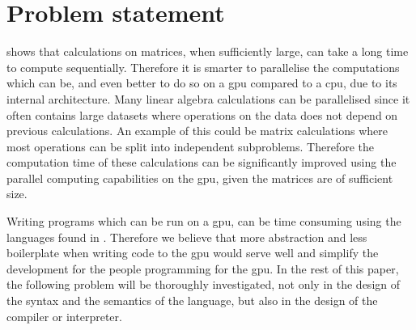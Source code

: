 \newpage
\section{Problem statement}
\label{sec:problem}

 shows that calculations on matrices, when sufficiently large, can take a long time to compute sequentially. 
Therefore it is smarter to parallelise the computations which can be, and even better to do so on a \acrshort{gpu} compared to a \acrshort{cpu}, due to its internal architecture. 
Many linear algebra calculations can be parallelised since it often contains large datasets where operations on the data does not depend on previous calculations. 
An example of this could be matrix calculations where most operations can be split into independent subproblems.
Therefore the computation time of these calculations can be significantly improved using the parallel computing capabilities on the \acrshort{gpu}, given the matrices are of sufficient size.

Writing programs which can be run on a \acrshort{gpu}, can be time consuming using the languages found in .
Therefore we believe that more abstraction and less boilerplate when writing code to the \acrshort{gpu} would serve well and simplify the development for the people programming for the \acrshort{gpu}. 
In the rest of this paper, the following problem will be thoroughly investigated, not only in the design of the syntax and the semantics of the language, but also in the design of the compiler or interpreter.

